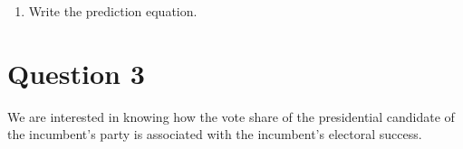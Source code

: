 \documentclass[12pt,letterpaper]{article}
\begin{document}
\begin{enumerate}
		\newpage
		\item Write the prediction equation.
		
		
		
	\end{enumerate}
	
	\newpage	
	\section*{Question 3}
	
	\noindent We are interested in knowing how the vote share of the presidential candidate of the incumbent's party is associated with the incumbent's electoral success.
	\vspace{.25cm}
\end{document}
